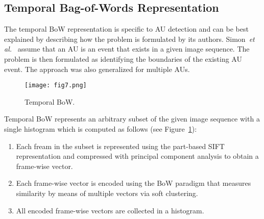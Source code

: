 \documentclass[10pt,twocolumn,letterpaper]{article}
\begin{document}
	\subsection*{Temporal Bag-of-Words Representation}
	The temporal BoW representation is specific to AU detection and can be best explained by describing how the problem is formulated by its authors. Simon~\emph{et al.}~\cite{Simon2010} assume that an AU is an event that exists in a given image sequence. The problem is then formulated as identifying the boundaries of the existing AU event. The approach was also generalized for multiple AUs.
	\begin{figure}[h]
		\centering
		\texttt{[image: fig7.png]}
		\caption{Temporal BoW.} \label{fig7}
	\end{figure}
	\par
	Temporal BoW represents an arbitrary subset of the given image sequence with a single histogram which is computed as follows (see Figure~\ref{fig7}):
	\begin{enumerate}
		\item Each fream in the subset is represented using the part-based SIFT representation and compressed with principal component analysis to obtain a frame-wise vector.
		\item Each frame-wise vector is encoded using the BoW paradigm that measures similarity by means of multiple vectors via soft clustering.
		\item All encoded frame-wise vectors are collected in a histogram.
	\end{enumerate}
	{\small
		
		
	}
\end{document}
